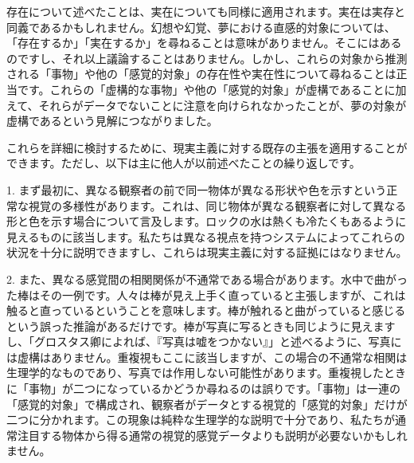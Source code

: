 \documentclass[a4paper,11pt,openany]{ltjsbook}
\begin{document}
存在について述べたことは、実在についても同様に適用されます。実在は実存と同義であるかもしれません。幻想や幻覚、夢における直感的対象については、「存在するか」「実在するか」を尋ねることは意味がありません。そこにはあるのですし、それ以上議論することはありません。しかし、これらの対象から推測される「事物」や他の「感覚的対象」の存在性や実在性について尋ねることは正当です。これらの「虚構的な事物」や他の「感覚的対象」が虚構であることに加えて、それらがデータでないことに注意を向けられなかったことが、夢の対象が虚構であるという見解につながりました。

これらを詳細に検討するために、現実主義に対する既存の主張を適用することができます。ただし、以下は主に他人が以前述べたことの繰り返しです。

1. まず最初に、異なる観察者の前で同一物体が異なる形状や色を示すという正常な視覚の多様性があります。これは、同じ物体が異なる観察者に対して異なる形と色を示す場合について言及します。ロックの水は熱くも冷たくもあるように見えるものに該当します。私たちは異なる視点を持つシステムによってこれらの状況を十分に説明できますし、これらは現実主義に対する証拠にはなりません。

2. また、異なる感覚間の相関関係が不通常である場合があります。水中で曲がった棒はその一例です。人々は棒が見え上手く直っていると主張しますが、これは触ると直っているということを意味します。棒が触れると曲がっていると感じるという誤った推論があるだけです。棒が写真に写るときも同じように見えますし、「グロスタス卿によれば、『写真は嘘をつかない』」と述べるように、写真には虚構はありません。重複視もここに該当しますが、この場合の不通常な相関は生理学的なものであり、写真では作用しない可能性があります。重複視したときに「事物」が二つになっているかどうか尋ねるのは誤りです。「事物」は一連の「感覚的対象」で構成され、観察者がデータとする視覚的「感覚的対象」だけが二つに分かれます。この現象は純粋な生理学的な説明で十分であり、私たちが通常注目する物体から得る通常の視覚的感覚データよりも説明が必要ないかもしれません。
\end{document}
